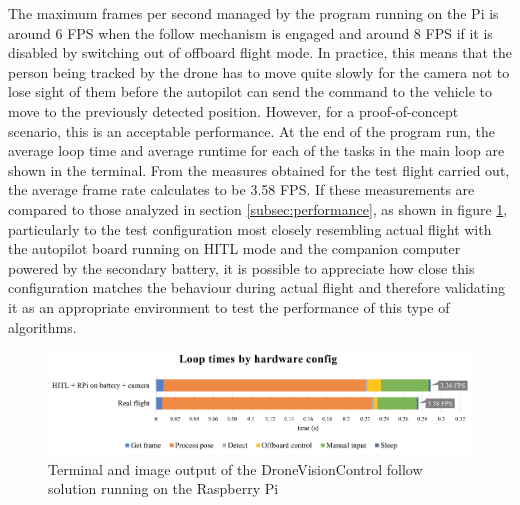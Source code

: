 The maximum frames per second managed by the program running on the Pi is around 6 FPS when the follow mechanism is engaged and around 8 FPS if it is disabled by switching out of offboard flight mode.
In practice, this means that the person being tracked by the drone has to move quite slowly for the camera not to lose sight of them before the autopilot can send the command to the vehicle to move to the previously detected position.
However, for a proof-of-concept scenario, this is an acceptable performance.
At the end of the program run, the average loop time and average runtime for each of the tasks in the main loop are shown in the terminal.
From the measures obtained for the test flight carried out, the average frame rate calculates to be 3.58 FPS.
If these measurements are compared to those analyzed in section \ref{subsec:performance}, as shown in figure \ref{fig:flight-performance}, particularly to the test configuration most closely resembling actual flight with the autopilot board running on HITL mode and the companion computer powered by the secondary battery, it is possible to appreciate how close this configuration matches the behaviour during actual flight and therefore validating it as an appropriate environment to test the performance of this type of algorithms.


\begin{figure}
  \centering
  \includegraphics[width=\textwidth, keepaspectratio]{img/perf-hitl-flight.png}
  \caption{Terminal and image output of the DroneVisionControl follow solution running on the Raspberry Pi}
  \label{fig:flight-performance}
\end{figure}
